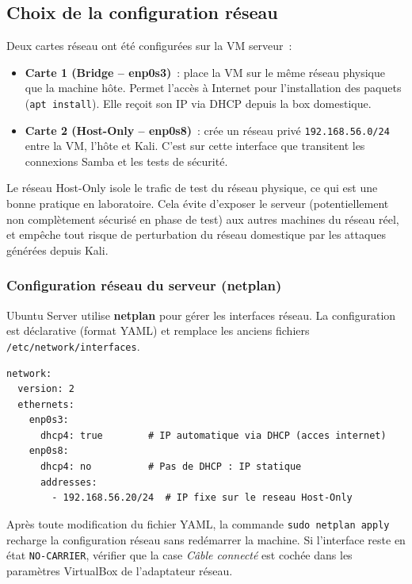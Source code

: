 \documentclass[12pt,a4paper]{article}
\begin{document}
\subsection{Choix de la configuration réseau}

Deux cartes réseau ont été configurées sur la VM serveur~:

\begin{itemize}[leftmargin=2em]
  \item \textbf{Carte 1 (Bridge -- enp0s3)}~: place la VM sur le même réseau physique que
    la machine hôte. Permet l'accès à Internet pour l'installation des paquets
    (\texttt{apt install}). Elle reçoit son IP via DHCP depuis la box domestique.
  \item \textbf{Carte 2 (Host-Only -- enp0s8)}~: crée un réseau privé
    \texttt{192.168.56.0/24} entre la VM, l'hôte et Kali. C'est sur cette interface que
    transitent les connexions Samba et les tests de sécurité.
\end{itemize}

\begin{infobox}
Le réseau Host-Only isole le trafic de test du réseau physique, ce qui est une bonne
pratique en laboratoire. Cela évite d'exposer le serveur (potentiellement non complètement
sécurisé en phase de test) aux autres machines du réseau réel, et empêche tout risque de
perturbation du réseau domestique par les attaques générées depuis Kali.
\end{infobox}

\subsubsection{Configuration réseau du serveur (netplan)}

Ubuntu Server utilise \textbf{netplan} pour gérer les interfaces réseau. La configuration
est déclarative (format YAML) et remplace les anciens fichiers \texttt{/etc/network/interfaces}.

\begin{lstlisting}[style=config, caption={/etc/netplan/00-installer-config.yaml}]
network:
  version: 2
  ethernets:
    enp0s3:
      dhcp4: true        # IP automatique via DHCP (acces internet)
    enp0s8:
      dhcp4: no          # Pas de DHCP : IP statique
      addresses:
        - 192.168.56.20/24  # IP fixe sur le reseau Host-Only
\end{lstlisting}

\begin{explainbox}
Après toute modification du fichier YAML, la commande \texttt{sudo netplan apply}
recharge la configuration réseau sans redémarrer la machine. Si l'interface reste en état
\texttt{NO-CARRIER}, vérifier que la case \textit{Câble connecté} est cochée dans les
paramètres VirtualBox de l'adaptateur réseau.
\end{explainbox}
\end{document}
